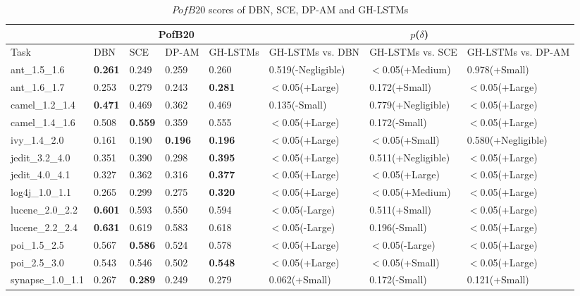 \documentclass[journal]{IEEEtran}
\begin{document}
\begin{table}[htbp]
	
	\scriptsize
	\caption{$PofB20$ scores of DBN, SCE, DP-AM and GH-LSTMs}
	\label{tab_pof}
	\tabcolsep 9pt
	\centering
	\begin{tabular}{m{2cm}|llll|lll}
		\toprule
		&\multicolumn{4}{c|}{PofB20}  &\multicolumn{3}{c}{$p$($\delta$)}   \\\midrule
		Task  &DBN  &SCE  &DP-AM  &GH-LSTMs  &GH-LSTMs vs. DBN  &GH-LSTMs vs. SCE  &GH-LSTMs vs. DP-AM\\\midrule
		ant\_1.5\_1.6     &\textbf{0.261}&0.249     &0.259     &0.260     &0.519(-Negligible)&$<$0.05(+Medium)&0.978(+Small)\\
		ant\_1.6\_1.7     &0.253     &0.279     &0.243     &\textbf{0.281}&$<$0.05(+Large)&0.172(+Small)&$<$0.05(+Large)\\
		camel\_1.2\_1.4   &\textbf{0.471}&0.469     &0.362     &0.469     &0.135(-Small)&0.779(+Negligible)&$<$0.05(+Large)\\
		camel\_1.4\_1.6   &0.508     &\textbf{0.559}&0.359     &0.555     &$<$0.05(+Large)&0.172(-Small)&$<$0.05(+Large)\\
		ivy\_1.4\_2.0     &0.161     &0.190     &\textbf{0.196}&\textbf{0.196}&$<$0.05(+Large)&$<$0.05(+Small)&0.580(+Negligible)\\
		jedit\_3.2\_4.0   &0.351     &0.390     &0.298     &\textbf{0.395}&$<$0.05(+Large)&0.511(+Negligible)&$<$0.05(+Large)\\
		jedit\_4.0\_4.1   &0.327     &0.362     &0.316     &\textbf{0.377}&$<$0.05(+Large)&$<$0.05(+Large)&$<$0.05(+Large)\\
		log4j\_1.0\_1.1   &0.265     &0.299     &0.275     &\textbf{0.320}&$<$0.05(+Large)&$<$0.05(+Medium)&$<$0.05(+Large)\\
		lucene\_2.0\_2.2  &\textbf{0.601}&0.593     &0.550     &0.594     &$<$0.05(-Large)&0.511(+Small)&$<$0.05(+Large)\\
		lucene\_2.2\_2.4  &\textbf{0.631}&0.619     &0.583     &0.618     &$<$0.05(-Large)&0.196(-Small)&$<$0.05(+Large)\\
		poi\_1.5\_2.5     &0.567     &\textbf{0.586}&0.524     &0.578     &$<$0.05(+Large)&$<$0.05(-Large)&$<$0.05(+Large)\\
		poi\_2.5\_3.0     &0.543     &0.546     &0.502     &\textbf{0.548}&$<$0.05(+Large)&$<$0.05(+Small)&$<$0.05(+Large)\\
		synapse\_1.0\_1.1 &0.267     &\textbf{0.289}&0.249     &0.279     &0.062(+Small)&0.172(-Small)&0.121(+Small)\\

\end{tabular}
\end{table}
\end{document}
